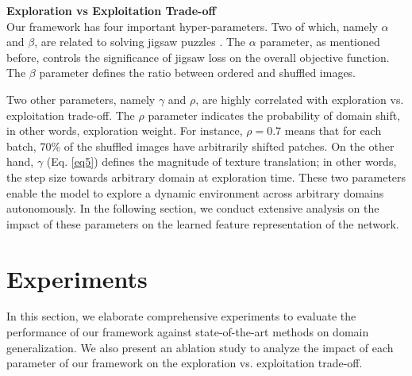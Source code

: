 \documentclass[10pt,twocolumn,letterpaper]{article}
\begin{document}
\vspace{2mm}
\noindent
\textbf{Exploration vs Exploitation Trade-off}\quad \\
Our framework has four important hyper-parameters. Two of which, namely $\alpha$ and $\beta$, are related to solving jigsaw puzzles \cite{carlucci2019domain}. The $\alpha$ parameter, as mentioned before, controls the significance of jigsaw loss on the overall objective function. The $\beta$ parameter defines the ratio between ordered and shuffled images.

Two other parameters, namely $\gamma$ and $\rho$, are highly correlated with exploration vs. exploitation trade-off.
The $\rho$ parameter indicates the probability of domain shift, in other words, exploration weight. For instance, $\rho = 0.7$ means that for each batch, 70\% of the shuffled images have arbitrarily shifted patches. On the other hand, $\gamma$ (Eq. \ref{eq5}) defines the magnitude of texture translation; in other words, the step size towards arbitrary domain at exploration time.
These two parameters enable the model to explore a dynamic environment across arbitrary domains autonomously.
In the following section, we conduct extensive analysis on the impact of these parameters on the learned feature representation of the network.
 \section{Experiments}
In this section, we elaborate comprehensive experiments to evaluate the performance of our framework against state-of-the-art methods on domain generalization. We also present an ablation study to analyze the impact of each parameter of our framework on the exploration vs. exploitation trade-off.
\end{document}
